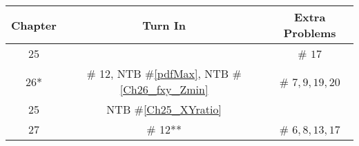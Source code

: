 \documentclass[12pt]{article}
\begin{document}
\begin{center}
\begin{tabular}{|c|c||c|}
\hline
Chapter & Turn In & Extra Problems\\
\hline






25 &  & \# $17$\\

\hline	


26* & \# 12,  NTB \#\ref{pdfMax}, NTB \#\ref{Ch26_fxy_Zmin}  & \# $7, 9, 19, 20$\\
\hline	

25 & NTB \#\ref{Ch25_XYratio}  & \\
\hline


27 &  \# 12**  & \# $6, 8, 13, 17$\\
\hline	
%
%
%

%
%
%
	

\end{tabular}
\end{center}
\end{document}

